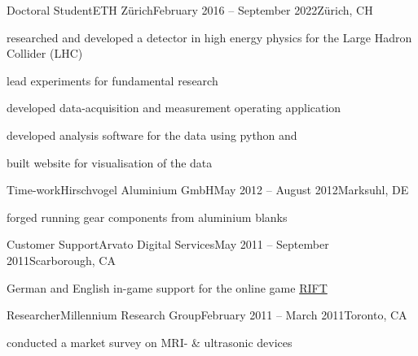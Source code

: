 \begin{cveventi}{Doctoral Student}{ETH Zürich}{February 2016 -- September 2022}{Z\"urich, CH}
  \item researched and developed a detector in high energy physics for the Large Hadron Collider (LHC)
  \item lead experiments for fundamental research
  \item developed data-acquisition and measurement operating application
  \item developed analysis software for the data using python and \cpp
  \item built website for visualisation of the data
\end{cveventi}
\divider
\begin{cveventis}{Time-work}{Hirschvogel Aluminium GmbH}{May 2012 -- August 2012}{Marksuhl, DE}
  \item forged running gear components from aluminium blanks
\end{cveventis}
%
\divider
%
\begin{cveventis}{Customer Support}{Arvato Digital Services}{May 2011 -- September 2011}{Scarborough, CA}
  \item German and English in-game support for the online game \href{https://www.trionworlds.com/rift/en/}{RIFT}
\end{cveventis}
%
\divider
%
\begin{cveventis}{Researcher}{Millennium Research Group}{February 2011 -- March 2011}{Toronto, CA}
  \item conducted a market survey on MRI- \& ultrasonic devices
\end{cveventis}
